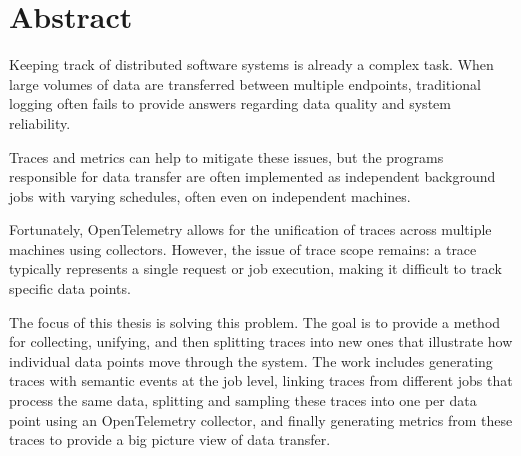 \chapter{Abstract}

Keeping track of distributed software systems is already a complex task.
When large volumes of data are transferred between multiple endpoints, 
traditional logging often fails to provide answers regarding data quality and system reliability.

Traces and metrics can help to mitigate these issues, but the programs responsible for data transfer 
are often implemented as independent background jobs with varying schedules,
often even on independent machines.

Fortunately, OpenTelemetry allows for the unification of traces across multiple machines using collectors.
However, the issue of trace scope remains:
a trace typically represents a single request or job execution,
making it difficult to track specific data points.

The focus of this thesis is solving this problem.
The goal is to provide a method for collecting, unifying, and then splitting traces into
new ones that illustrate how individual data points move through the system.
The work includes generating traces with semantic events at the job level,
linking traces from different jobs that process the same data,
splitting and sampling these traces into one per data point using an OpenTelemetry collector,
and finally generating metrics from these traces to provide a big picture view of data transfer.

